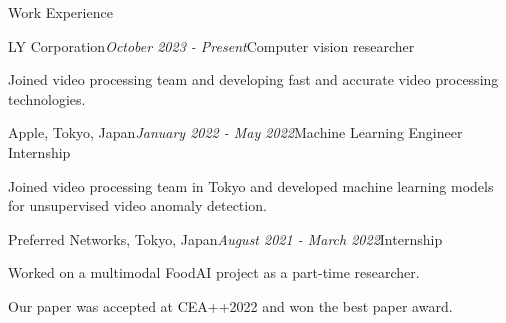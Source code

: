 \begin{rSection}{Work Experience}

\begin{rSubsection}{LY Corporation}{\em October 2023 - Present}{Computer vision researcher}{}
\item Joined video processing team and developing fast and accurate video processing technologies.
\end{rSubsection}

\begin{rSubsection}{Apple, Tokyo, Japan}{\em January 2022 - May 2022}{Machine Learning Engineer Internship}{}
\item Joined video processing team in Tokyo and developed machine learning models for unsupervised video anomaly detection.
\end{rSubsection}

\begin{rSubsection}{Preferred Networks, Tokyo, Japan}{\em August 2021 - March 2022}{Internship}{}
\item Worked on a multimodal FoodAI project as a part-time researcher.
\item Our paper was accepted at CEA++2022 and won the best paper award.
\end{rSubsection}

\end{rSection}
